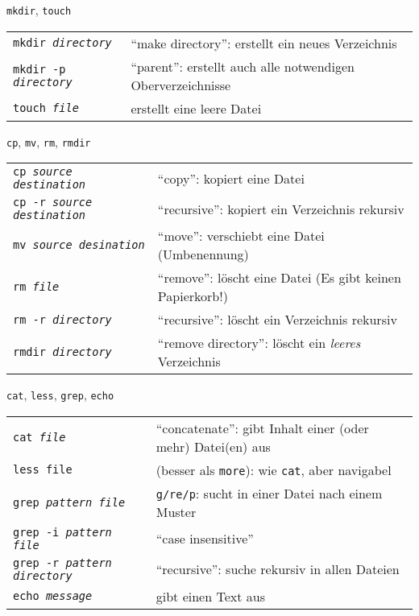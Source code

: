 \begin{frame}{\texttt{mkdir}, \texttt{touch}}
  \begin{tabular}{lp{17em}}
    \texttt{mkdir \textit{directory}} & \enquote{make directory}: erstellt ein neues Verzeichnis \\
    \texttt{mkdir -p \textit{directory}} & \enquote{parent}: erstellt auch alle notwendigen Oberverzeichnisse \\
    \texttt{touch \textit{file}} & erstellt eine leere Datei
  \end{tabular}
\end{frame}

\begin{frame}{\texttt{cp}, \texttt{mv}, \texttt{rm}, \texttt{rmdir}}
  \begin{tabular}{lp{15em}}
    \texttt{cp \textit{source} \textit{destination}} & \enquote{copy}: kopiert eine Datei \\
    \texttt{cp -r \textit{source} \textit{destination}} & \enquote{recursive}: kopiert ein Verzeichnis rekursiv \\
    \texttt{mv \textit{source} \textit{desination}} & \enquote{move}: verschiebt eine Datei (Umbenennung) \\
    \texttt{rm \textit{file}} & \enquote{remove}: löscht eine Datei (Es gibt keinen Papierkorb!) \\
    \texttt{rm -r \textit{directory}} & \enquote{recursive}: löscht ein Verzeichnis rekursiv \\
    \texttt{rmdir \textit{directory}} & \enquote{remove directory}: löscht ein \emph{leeres} Verzeichnis
  \end{tabular}
\end{frame}

\begin{frame}{\texttt{cat}, \texttt{less}, \texttt{grep}, \texttt{echo}}
  \begin{tabular}{lp{15em}}
    \texttt{cat \textit{file}} & \enquote{concatenate}: gibt Inhalt einer (oder mehr) Datei(en) aus \\
    \texttt{less \texttt{file}} & (besser als \texttt{more}): wie \texttt{cat}, aber navigabel \\
    \texttt{grep \textit{pattern} \textit{file}} & \texttt{g/re/p}: sucht in einer Datei nach einem Muster \\
    \texttt{grep -i \textit{pattern} \textit{file}} & \enquote{case insensitive} \\
    \texttt{grep -r \textit{pattern} \textit{directory}} & \enquote{recursive}: suche rekursiv in allen Dateien \\
    \texttt{echo \textit{message}} & gibt einen Text aus
  \end{tabular}
\end{frame}

